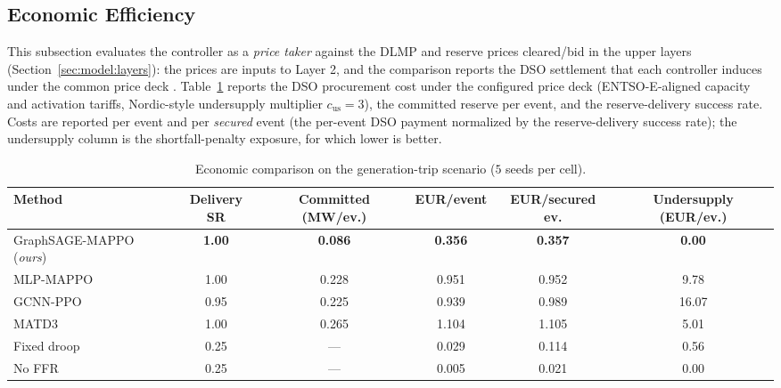 \documentclass[lettersize,journal]{IEEEtran}
\begin{document}
\subsection{Economic Efficiency}
\label{ssec:res_econ}
 
This subsection evaluates the controller as a \emph{price taker} against the DLMP and reserve prices cleared/bid in the upper layers (Section~\ref{sec:model:layers}): the prices are inputs to Layer 2, and the comparison reports the DSO settlement that each controller induces under the common price deck \cite{rahimiyan2016pricetaker,li2014dlmp}. Table~\ref{tab:econ} reports the DSO procurement cost under the configured price deck (ENTSO-E-aligned capacity and activation tariffs, Nordic-style undersupply multiplier $c_{\mathrm{us}}=3$), the committed reserve per event, and the reserve-delivery success rate. Costs are reported per event and per \emph{secured} event (the per-event DSO payment normalized by the reserve-delivery success rate); the undersupply column is the shortfall-penalty exposure, for which lower is better.
 
\begin{table}[!t]
\caption{Economic comparison on the generation-trip scenario
($5$ seeds per cell).}
\label{tab:econ}
\centering
\footnotesize
\begin{tabular}{lccccc}
\toprule
Method & Delivery SR & Committed (MW/ev.) & EUR/event & EUR/secured ev. & Undersupply (EUR/ev.) \\
\midrule
GraphSAGE-MAPPO (\emph{ours}) & \textbf{1.00} & \textbf{0.086} & \textbf{0.356} & \textbf{0.357} & \textbf{0.00} \\
MLP-MAPPO                     & 1.00          & 0.228          & 0.951          & 0.952          & 9.78  \\
GCNN-PPO                      & 0.95          & 0.225          & 0.939          & 0.989          & 16.07 \\
MATD3                         & 1.00          & 0.265          & 1.104          & 1.105          & 5.01  \\
Fixed droop                   & 0.25          & ---            & 0.029          & 0.114          & 0.56  \\
No FFR                        & 0.25          & ---            & 0.005          & 0.021          & 0.00  \\
\bottomrule
\end{tabular}
\end{table}
 
\end{document}
